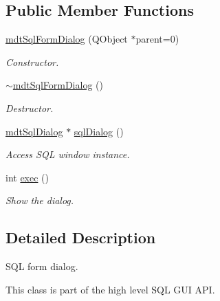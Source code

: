 \subsection*{Public Member Functions}
\begin{DoxyCompactItemize}
\item 
\hypertarget{classmdt_sql_form_dialog_af60a25c2654f0af7c62df42854af4bb1}{
\hyperlink{classmdt_sql_form_dialog_af60a25c2654f0af7c62df42854af4bb1}{mdtSqlFormDialog} (QObject $\ast$parent=0)}
\label{classmdt_sql_form_dialog_af60a25c2654f0af7c62df42854af4bb1}

\begin{DoxyCompactList}\small\item\em Constructor. \end{DoxyCompactList}\item 
\hypertarget{classmdt_sql_form_dialog_ac75cd78f6fc2ccac75a6d6fab6922a5e}{
\hyperlink{classmdt_sql_form_dialog_ac75cd78f6fc2ccac75a6d6fab6922a5e}{$\sim$mdtSqlFormDialog} ()}
\label{classmdt_sql_form_dialog_ac75cd78f6fc2ccac75a6d6fab6922a5e}

\begin{DoxyCompactList}\small\item\em Destructor. \end{DoxyCompactList}\item 
\hyperlink{classmdt_sql_dialog}{mdtSqlDialog} $\ast$ \hyperlink{classmdt_sql_form_dialog_a473170aea40ee8264f96c23fa05b60f1}{sqlDialog} ()
\begin{DoxyCompactList}\small\item\em Access SQL window instance. \end{DoxyCompactList}\item 
\hypertarget{classmdt_sql_form_dialog_abc0e9db0da2b1e27d7f5853ecc465c1a}{
int \hyperlink{classmdt_sql_form_dialog_abc0e9db0da2b1e27d7f5853ecc465c1a}{exec} ()}
\label{classmdt_sql_form_dialog_abc0e9db0da2b1e27d7f5853ecc465c1a}

\begin{DoxyCompactList}\small\item\em Show the dialog. \end{DoxyCompactList}\end{DoxyCompactItemize}


\subsection{Detailed Description}
SQL form dialog. 

This class is part of the high level SQL GUI API.

